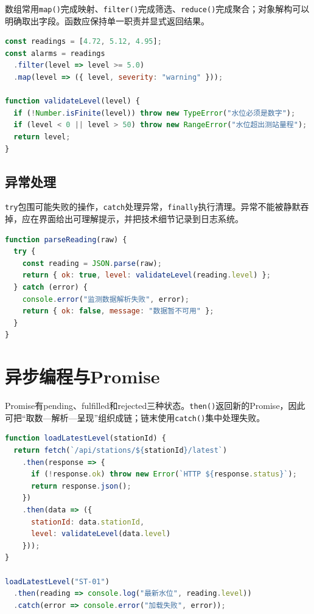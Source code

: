 数组常用\texttt{map()}完成映射、\texttt{filter()}完成筛选、\texttt{reduce()}完成聚合；对象解构可以明确取出字段。函数应保持单一职责并显式返回结果。

\begin{lstlisting}[language=JavaScript]
const readings = [4.72, 5.12, 4.95];
const alarms = readings
  .filter(level => level >= 5.0)
  .map(level => ({ level, severity: "warning" }));

function validateLevel(level) {
  if (!Number.isFinite(level)) throw new TypeError("水位必须是数字");
  if (level < 0 || level > 50) throw new RangeError("水位超出测站量程");
  return level;
}
\end{lstlisting}

\subsection{异常处理}

\texttt{try}包围可能失败的操作，\texttt{catch}处理异常，\texttt{finally}执行清理。异常不能被静默吞掉，应在界面给出可理解提示，并把技术细节记录到日志系统。

\begin{lstlisting}[language=JavaScript]
function parseReading(raw) {
  try {
    const reading = JSON.parse(raw);
    return { ok: true, level: validateLevel(reading.level) };
  } catch (error) {
    console.error("监测数据解析失败", error);
    return { ok: false, message: "数据暂不可用" };
  }
}
\end{lstlisting}

\section{异步编程与Promise}

Promise有pending、fulfilled和rejected三种状态。\texttt{then()}返回新的Promise，因此可把“取数—解析—呈现”组织成链；链末使用\texttt{catch()}集中处理失败。

\begin{lstlisting}[language=JavaScript]
function loadLatestLevel(stationId) {
  return fetch(`/api/stations/${stationId}/latest`)
    .then(response => {
      if (!response.ok) throw new Error(`HTTP ${response.status}`);
      return response.json();
    })
    .then(data => ({
      stationId: data.stationId,
      level: validateLevel(data.level)
    }));
}

loadLatestLevel("ST-01")
  .then(reading => console.log("最新水位", reading.level))
  .catch(error => console.error("加载失败", error));
\end{lstlisting}

